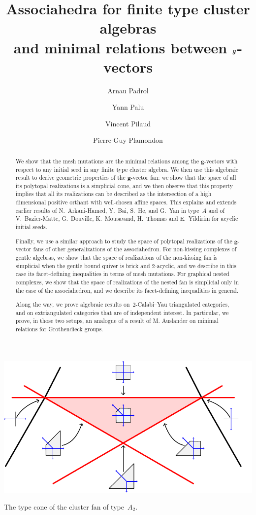 \documentclass{amsart}
\title[Generalized associahedra and minimal relations between $\b{g}$-vectors]{Associahedra for finite type cluster algebras \\ and minimal relations between $\b{g}$-vectors}
\author{Arnau Padrol}
\author{Yann Palu}
\author{Vincent Pilaud}
\author{Pierre-Guy Plamondon}
\theoremstyle{definition}
\renewcommand{\b}[1]{{\boldsymbol{#1}}} %
\begin{document}
\begin{abstract}
We show that the mesh mutations are the minimal relations among the $\b{g}$-vectors with respect to any initial seed in any finite type cluster algebra.
We then use this algebraic result to derive geometric properties of the $\b{g}$-vector fan: we show that the space of all its polytopal realizations is a simplicial cone, and we then observe that this property implies that all its realizations can be described as the intersection of a high dimensional positive orthant with well-chosen affine spaces.
This explains and extends earlier results of N.~Arkani-Hamed, Y.~Bai, S.~He, and G.~Yan in type~$A$ and of V.~Bazier-Matte, G.~Douville, K.~Mousavand, H.~Thomas and E.~Yildirim for acyclic initial seeds.

Finally, we use a similar approach to study the space of polytopal realizations of the $\b{g}$-vector fans of other generalizations of the associahedron.
For non-kissing complexes of gentle algebras, we show that the space of realizations of the non-kissing fan is simplicial when the gentle bound quiver is brick and $2$-acyclic, and we describe in this case its facet-defining inequalities in terms of mesh mutations.
For graphical nested complexes, we show that the space of realizations of the nested fan is simplicial only in the case of the associahedron, and we describe its facet-defining inequalities in general.

Along the way, we prove algebraic results on~$2$-Calabi--Yau triangulated categories, and on extriangulated categories that are of independent interest.
In particular, we prove, in those two setups, an analogue of a result of M. Auslander on minimal relations for Grothendieck groups.
\end{abstract}

\maketitle

\vspace{2cm}
\centerline{\includegraphics[scale=.8]{typeConeCoarsenings}}
\vspace{.5cm}
\centerline{The type cone of the cluster fan of type~$A_2$.}
\end{document}
